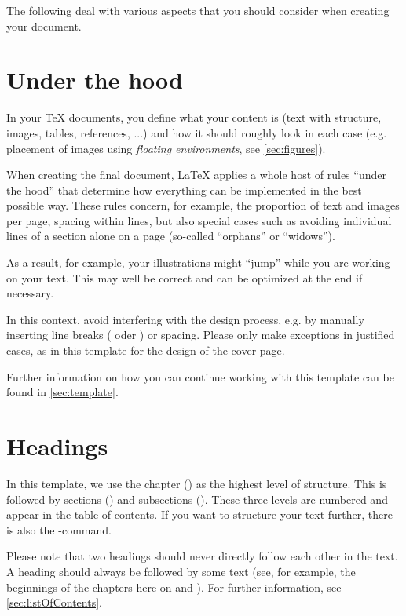 The following  deal with various aspects that 
you should consider when creating your document.
%
\section{Under the hood}
\label{sec:hood}
In your \TeX{} documents, you define what your content is (text with structure, 
images, tables, references, ...) and how it should roughly look in each case 
(e.g. placement of images using \emph{floating environments}, see 
\cref{sec:figures}).

When creating the final document, \LaTeX{} applies a whole host of rules
\enquote{under the hood} that determine how everything can be implemented in 
the best possible way. These rules concern, for example, the proportion of text 
and images per page, spacing within lines, but also special cases such as 
avoiding individual lines of a section alone on a page (so-called
\enquote{orphans} or \enquote{widows}).

As a result, for example, your illustrations might \enquote{jump} while you are 
working on your text. This may well be correct and can be optimized at the end 
if necessary.

In this context, avoid interfering with the design process, e.g. by manually 
inserting line breaks ( oder \comm{\textbackslash}) or spacing. 
Please only make exceptions in justified cases, as in this template for the 
design of the cover page.

Further information on how you can continue working with this template can be 
found in  \cref{sec:template}.

\section{Headings}
\label{sec:headings}
In this template, we use the chapter () as the highest level of 
structure. This is followed by sections () and subsections  
(). These three levels are numbered and appear in the table of 
contents. If you want to structure your text further, there is also the 
-command.

Please note that two headings should never directly follow each other in the 
text. A heading should always be followed by some text (see, for example, the 
beginnings of the chapters here on  and
). For further information, see 
\cref{sec:listOfContents}.

